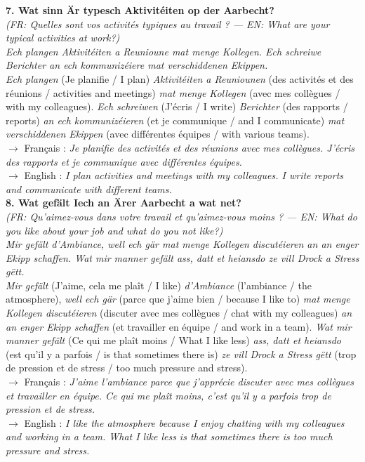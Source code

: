 \noindent\textbf{7. Wat sinn Är typesch Aktivitéiten op der Aarbecht?}\\
\textit{(FR: Quelles sont vos activités typiques au travail ? — EN: What are your typical activities at work?)}\\[0.3em]
\textit{Ech plangen Aktivitéiten a Reunioune mat menge Kollegen. Ech schreiwe Berichter an ech kommunizéiere mat verschiddenen Ekippen.}\\
\textit{Ech plangen} (Je planifie / I plan) \textit{Aktivitéiten a Reuniounen} (des activités et des réunions / activities and meetings) \textit{mat menge Kollegen} (avec mes collègues / with my colleagues). \textit{Ech schreiwen} (J'écris / I write) \textit{Berichter} (des rapports / reports) \textit{an ech kommunizéieren} (et je communique / and I communicate) \textit{mat verschiddenen Ekippen} (avec différentes équipes / with various teams).\\
$\rightarrow$ Français : \textit{Je planifie des activités et des réunions avec mes collègues. J'écris des rapports et je communique avec différentes équipes.}\\
$\rightarrow$ English : \textit{I plan activities and meetings with my colleagues. I write reports and communicate with different teams.}\\[0.8em]

\noindent\textbf{8. Wat gefält Iech an Ärer Aarbecht a wat net?}\\
\textit{(FR: Qu'aimez-vous dans votre travail et qu'aimez-vous moins ? — EN: What do you like about your job and what do you not like?)}\\[0.3em]
\textit{Mir gefält d'Ambiance, well ech gär mat menge Kollegen discutéieren an an enger Ekipp schaffen. Wat mir manner gefält ass, datt et heiansdo ze vill Drock a Stress gëtt.}\\
\textit{Mir gefält} (J'aime, cela me plaît / I like) \textit{d'Ambiance} (l'ambiance / the atmosphere), \textit{well ech gär} (parce que j'aime bien / because I like to) \textit{mat menge Kollegen discutéieren} (discuter avec mes collègues / chat with my colleagues) \textit{an an enger Ekipp schaffen} (et travailler en équipe / and work in a team). \textit{Wat mir manner gefält} (Ce qui me plaît moins / What I like less) \textit{ass, datt et heiansdo} (est qu'il y a parfois / is that sometimes there is) \textit{ze vill Drock a Stress gëtt} (trop de pression et de stress / too much pressure and stress).\\
$\rightarrow$ Français : \textit{J'aime l'ambiance parce que j'apprécie discuter avec mes collègues et travailler en équipe. Ce qui me plaît moins, c'est qu'il y a parfois trop de pression et de stress.}\\
$\rightarrow$ English : \textit{I like the atmosphere because I enjoy chatting with my colleagues and working in a team. What I like less is that sometimes there is too much pressure and stress.}\\[0.8em]

